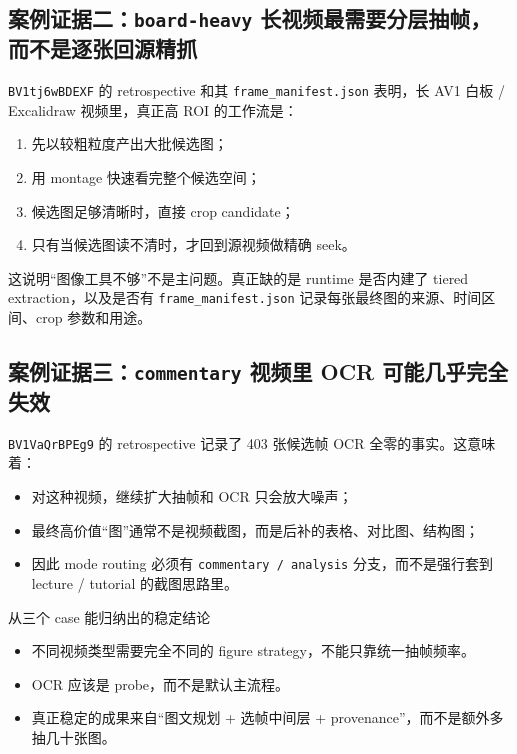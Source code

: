 \documentclass[a4paper]{article}
\begin{document}
\subsection{案例证据二：\texttt{board-heavy} 长视频最需要分层抽帧，而不是逐张回源精抓}

\texttt{BV1tj6wBDEXF} 的 retrospective 和其 \texttt{frame\_manifest.json} 表明，长 AV1 白板 / Excalidraw 视频里，真正高 ROI 的工作流是：

\begin{enumerate}
\item 先以较粗粒度产出大批候选图；
\item 用 montage 快速看完整个候选空间；
\item 候选图足够清晰时，直接 crop candidate；
\item 只有当候选图读不清时，才回到源视频做精确 seek。
\end{enumerate}

这说明“图像工具不够”不是主问题。真正缺的是 runtime 是否内建了 tiered extraction，以及是否有 \texttt{frame\_manifest.json} 记录每张最终图的来源、时间区间、crop 参数和用途。

\subsection{案例证据三：\texttt{commentary} 视频里 OCR 可能几乎完全失效}

\texttt{BV1VaQrBPEg9} 的 retrospective 记录了 403 张候选帧 OCR 全零的事实。这意味着：

\begin{itemize}
\item 对这种视频，继续扩大抽帧和 OCR 只会放大噪声；
\item 最终高价值“图”通常不是视频截图，而是后补的表格、对比图、结构图；
\item 因此 mode routing 必须有 \texttt{commentary / analysis} 分支，而不是强行套到 lecture / tutorial 的截图思路里。
\end{itemize}

\begin{evidencebox}{从三个 case 能归纳出的稳定结论}
\begin{itemize}
\item 不同视频类型需要完全不同的 figure strategy，不能只靠统一抽帧频率。
\item OCR 应该是 probe，而不是默认主流程。
\item 真正稳定的成果来自“图文规划 + 选帧中间层 + provenance”，而不是额外多抽几十张图。
\end{itemize}
\end{evidencebox}
\end{document}
